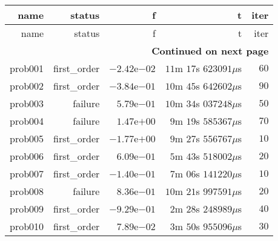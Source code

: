 \documentclass[varwidth=20cm,crop=true]{standalone}
\begin{document}
\begin{longtable}{rrrrr}
  \hline
  name & status & f & t & iter \\\hline
  \endfirsthead
  \hline
  name & status & f & t & iter \\\hline
  \endhead
  \hline
  \multicolumn{5}{r}{{\bfseries Continued on next page}}\\
  \hline
  \endfoot
  \endlastfoot
  prob001 & first\_order & \(-2.42\)e\(-02\) & \(11\)m \(17\)s \(623091 \mu\)s & \(    60\) \\
  prob002 & first\_order & \(-3.84\)e\(-01\) & \(10\)m \(45\)s \(642602 \mu\)s & \(    90\) \\
  prob003 & failure & \( 5.79\)e\(-01\) & \(10\)m \(34\)s \(037248 \mu\)s & \(    50\) \\
  prob004 & failure & \( 1.47\)e\(+00\) & \( 9\)m \(19\)s \(585367 \mu\)s & \(    70\) \\
  prob005 & first\_order & \(-1.77\)e\(+00\) & \( 9\)m \(27\)s \(556767 \mu\)s & \(    10\) \\
  prob006 & first\_order & \( 6.09\)e\(-01\) & \( 5\)m \(43\)s \(518002 \mu\)s & \(    20\) \\
  prob007 & first\_order & \(-1.40\)e\(-01\) & \( 7\)m \(06\)s \(141220 \mu\)s & \(    10\) \\
  prob008 & failure & \( 8.36\)e\(-01\) & \(10\)m \(21\)s \(997591 \mu\)s & \(    20\) \\
  prob009 & first\_order & \(-9.29\)e\(-01\) & \( 2\)m \(28\)s \(248989 \mu\)s & \(    40\) \\
  prob010 & first\_order & \( 7.89\)e\(-02\) & \( 3\)m \(50\)s \(955096 \mu\)s & \(    30\) \\\hline
\end{longtable}
\end{document}
